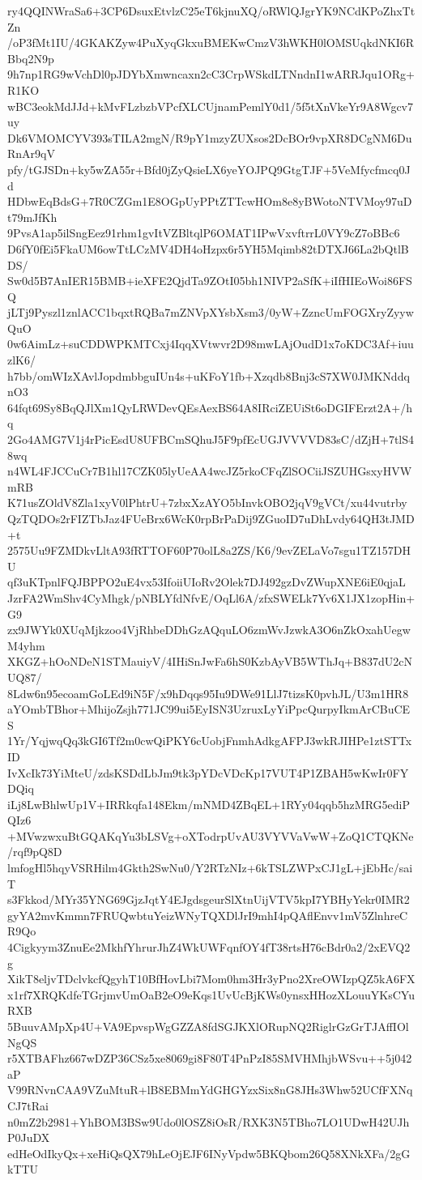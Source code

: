 ry4QQINWraSa6+3CP6DsuxEtvlzC25eT6kjnuXQ/oRWlQJgrYK9NCdKPoZhxTtZn
/oP3fMt1IU/4GKAKZyw4PuXyqGkxuBMEKwCmzV3hWKH0lOMSUqkdNKI6RBbq2N9p
9h7np1RG9wVchDl0pJDYbXmwncaxn2cC3CrpWSkdLTNndnI1wARRJqu1ORg+R1KO
wBC3eokMdJJd+kMvFLzbzbVPcfXLCUjnamPemlY0d1/5f5tXnVkeYr9A8Wgcv7uy
Dk6VMOMCYV393sTILA2mgN/R9pY1mzyZUXsos2DcBOr9vpXR8DCgNM6DuRnAr9qV
pfy/tGJSDn+ky5wZA55r+Bfd0jZyQsieLX6yeYOJPQ9GtgTJF+5VeMfycfmcq0Jd
HDbwEqBdsG+7R0CZGm1E8OGpUyPPtZTTcwHOm8e8yBWotoNTVMoy97uDt79mJfKh
9PvsA1ap5ilSngEez91rhm1gvItVZBltqlP6OMAT1IPwVxvftrrL0VY9cZ7oBBc6
D6fY0fEi5FkaUM6owTtLCzMV4DH4oHzpx6r5YH5Mqimb82tDTXJ66La2bQtlBDS/
Sw0d5B7AnIER15BMB+ieXFE2QjdTa9ZOtI05bh1NIVP2aSfK+iIfHIEoWoi86FSQ
jLTj9Pyszl1znlACC1bqxtRQBa7mZNVpXYsbXsm3/0yW+ZzncUmFOGXryZyywQuO
0w6AimLz+suCDDWPKMTCxj4IqqXVtwvr2D98mwLAjOudD1x7oKDC3Af+iuuzlK6/
h7bb/omWIzXAvlJopdmbbguIUn4s+uKFoY1fb+Xzqdb8Bnj3cS7XW0JMKNddqnO3
64fqt69Sy8BqQJlXm1QyLRWDevQEsAexBS64A8IRciZEUiSt6oDGIFErzt2A+/hq
2Go4AMG7V1j4rPicEsdU8UFBCmSQhuJ5F9pfEcUGJVVVVD83sC/dZjH+7tlS48wq
n4WL4FJCCuCr7B1hl17CZK05lyUeAA4wcJZ5rkoCFqZlSOCiiJSZUHGsxyHVWmRB
K71usZOldV8Zla1xyV0lPhtrU+7zbxXzAYO5bInvkOBO2jqV9gVCt/xu44vutrby
QzTQDOs2rFIZTbJaz4FUeBrx6WcK0rpBrPaDij9ZGuoID7uDhLvdy64QH3tJMD+t
2575Uu9FZMDkvLltA93fRTTOF60P70olL8a2ZS/K6/9evZELaVo7sgu1TZ157DHU
qf3uKTpnlFQJBPPO2uE4vx53IfoiiUIoRv2Olek7DJ492gzDvZWupXNE6iE0qjaL
JzrFA2WmShv4CyMhgk/pNBLYfdNfvE/OqLl6A/zfxSWELk7Yv6X1JX1zopHin+G9
zx9JWYk0XUqMjkzoo4VjRhbeDDhGzAQquLO6zmWvJzwkA3O6nZkOxahUegwM4yhm
XKGZ+hOoNDeN1STMauiyV/4IHiSnJwFa6hS0KzbAyVB5WThJq+B837dU2cNUQ87/
8Ldw6n95ecoamGoLEd9iN5F/x9hDqqs95Iu9DWe91LlJ7tizsK0pvhJL/U3m1HR8
aYOmbTBhor+MhijoZsjh771JC99ui5EyISN3UzruxLyYiPpcQurpyIkmArCBuCES
1Yr/YqjwqQq3kGI6Tf2m0cwQiPKY6cUobjFnmhAdkgAFPJ3wkRJIHPe1ztSTTxID
IvXcIk73YiMteU/zdsKSDdLbJm9tk3pYDcVDcKp17VUT4P1ZBAH5wKwIr0FYDQiq
iLj8LwBhlwUp1V+IRRkqfa148Ekm/mNMD4ZBqEL+1RYy04qqb5hzMRG5ediPQIz6
+MVwzwxuBtGQAKqYu3bLSVg+oXTodrpUvAU3VYVVaVwW+ZoQ1CTQKNe/rqf9pQ8D
lmfogHl5hqyVSRHilm4Gkth2SwNu0/Y2RTzNIz+6kTSLZWPxCJ1gL+jEbHc/saiT
s3Fkkod/MYr35YNG69GjzJqtY4EJgdsgeurSlXtnUijVTV5kpI7YBHyYekr0IMR2
gyYA2mvKmmn7FRUQwbtuYeizWNyTQXDlJrI9mhI4pQAflEnvv1mV5ZlnhreCR9Qo
4Cigkyym3ZnuEe2MkhfYhrurJhZ4WkUWFqnfOY4fT38rtsH76cBdr0a2/2xEVQ2g
XikT8eljvTDclvkcfQgyhT10BfHovLbi7Mom0hm3Hr3yPno2XreOWIzpQZ5kA6FX
x1rf7XRQKdfeTGrjmvUmOaB2eO9eKqs1UvUcBjKWs0ynsxHHozXLouuYKsCYuRXB
5BuuvAMpXp4U+VA9EpvspWgGZZA8fdSGJKXlORupNQ2RiglrGzGrTJAffIOlNgQS
r5XTBAFhz667wDZP36CSz5xe8069gi8F80T4PnPzI85SMVHMhjbWSvu++5j042aP
V99RNvnCAA9VZuMtuR+lB8EBMmYdGHGYzxSix8nG8JHs3Whw52UCfFXNqCJ7tRai
n0mZ2b2981+YhBOM3BSw9Udo0lOSZ8iOsR/RXK3N5TBho7LO1UDwH42UJhP0JuDX
edHeOdIkyQx+xeHiQsQX79hLeOjEJF6INyVpdw5BKQbom26Q58XNkXFa/2gGkTTU
